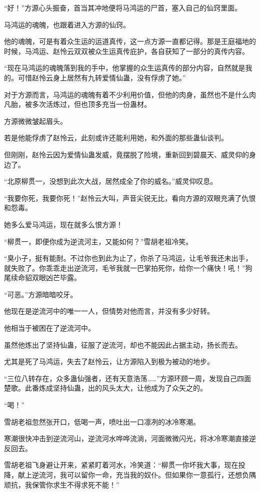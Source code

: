 \begin{this_body}
“好！”方源心头振奋，首当其冲地便将马鸿运的尸首，塞入自己的仙窍里面。

马鸿运的魂魄，也跟着进入方源的仙窍。

他的魂魄，可是有着众生运的运道真传，这一点方源一直都记得。那是王庭福地的时候，马鸿运、赵怜云双双被众生运真传庇护，各自获知了一部分的真传内容。

“现在马鸿运的魂魄落到我的手中，他掌握的众生运真传的部分内容，自然就是我的。可惜赵怜云身上居然有九转爱情仙蛊，没有俘虏了她。”

对于方源而言，马鸿运的魂魄有着不少利用价值，但他的肉身，虽然也不是什么肉凡胎，被多次活炼过，但也顶多充当一份蛊材。

方源微微皱起眉头。

若是他能俘虏了赵怜云，此刻或许还能利用她，和外面的那些蛊仙谈判。

但刚刚，赵怜云因为爱情仙蛊发威，竟摆脱了险境，重新回到碧晨天、威灵仰的身边了。

“北原柳贯一，没想到此次大战，居然成全了你的威名。”威灵仰叹息。

“我要你死，我要你死！”赵怜云大叫，声音尖锐无比，看向方源的双眼充满了仇恨和怨毒。

她多么爱马鸿运，现在就多么恨方源！

“柳贯一，即便你成为逆流河主，又能如何？”雪胡老祖冷笑。

“臭小子，挺有能耐。不过你也到此为止了，你杀了马鸿运，让毛爷我还未出手，就失败了。你乖乖走出逆流河，毛爷我就一巴掌拍死你，给你一个痛快！吼！”狗尾续命貂双眼凶芒毕露。

“可恶。”方源暗暗咬牙。

他现在是逆流河中的唯一一人，但情势对他而言，并没有多少好转。

他相当于被困在了逆流河中。

虽然他炼出了坚持仙蛊，征服了逆流河，却也不能因此占据主动，扬长而去。

尤其是死了马鸿运，失去了赵怜云，让方源陷入到极为被动的地步。

“三位八转存在，众多蛊仙强者，还有天意浩荡……”方源环顾一周，发现自己四面楚歌。此番炼成坚持仙蛊，出的风头太大，让他成为了众矢之的。

“喝！”

雪胡老祖忽然张开口，低喝一声，喷吐出一口凛冽的冰冷寒潮。

寒潮很快冲击到逆流河山，逆流河水哗哗流淌，河面微微闪光，将冰冷寒潮直接逆反回去。

雪胡老祖飞身避让开来，紧紧盯着河水，冷笑道：“柳贯一你坏我大事，现在投降，献上逆流河，我可以留你一命，充当我的奴仆。但如果你一意孤行，还想负隅顽抗，我保管你求生不得求死不能！”


\end{this_body}
